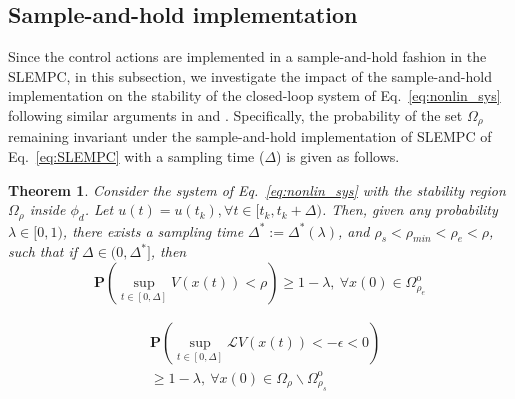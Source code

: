 \documentclass[letterpaper, 10pt, conference]{ieeeconf}
\newtheorem{thm}{Theorem}
\begin{document}
\subsection{Sample-and-hold implementation}

Since the control actions are implemented in a sample-and-hold fashion in the SLEMPC, in this subsection, we investigate the impact of the sample-and-hold implementation on the stability of the closed-loop system of Eq.~\ref{eq:nonlin_sys} following similar arguments in \cite{mahmood2012lyapunov} and \cite{homer2017output}. Specifically, the probability of the set $\Omega_{\rho}$ remaining invariant under the sample-and-hold implementation of SLEMPC of Eq.~\ref{eq:SLEMPC} with a sampling time ($\Delta$) is given as follows.
\begin{thm}\label{thm3}
	Consider the system of Eq.~\ref{eq:nonlin_sys} with the stability region $\Omega_{\rho}$ inside $\phi_d$. Let $u(t)=u(t_k), \forall t \in [t_{k}, t_k+\Delta)$. Then, given any probability $\lambda \in [0,1)$, there exists a sampling time $\Delta^* := \Delta^*(\lambda)$, and $\rho_s < \rho_{min} <\rho_{e} <\rho$, such that if $\Delta \in (0,\Delta^*]$, then 	
	\begin{equation}
	\label{eq:sample_p1}
	\mathbf{P}(\sup \limits_{t \in[0,\Delta]}V(x(t)) < \rho ) \geq 1-
	\lambda,~\forall x(0) \in \Omega_{\rho_e}^{\text{o}}
	\end{equation}
	
	\begin{equation}
	\label{eq:sample_p2}
	\begin{split}
	&\mathbf{P}(\sup \limits_{t \in [0, \Delta]}
	\mathcal{L}V(x(t))<- \epsilon < 0)\\
	&\geq 1- \lambda,~\forall x(0) \in \Omega_\rho \backslash \Omega_{\rho_s}^{\text{o}}
	\end{split}
	\end{equation}
\end{thm}

\hspace{0.4cm}\\
\end{document}
